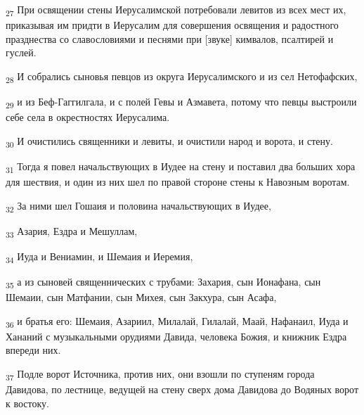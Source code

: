 \begin{tcolorbox}
\textsubscript{27} При освящении стены Иерусалимской потребовали левитов из всех мест их, приказывая им придти в Иерусалим для совершения освящения и радостного празднества со славословиями и песнями при [звуке] кимвалов, псалтирей и гуслей.
\end{tcolorbox}
\begin{tcolorbox}
\textsubscript{28} И собрались сыновья певцов из округа Иерусалимского и из сел Нетофафских,
\end{tcolorbox}
\begin{tcolorbox}
\textsubscript{29} и из Беф-Гаггилгала, и с полей Гевы и Азмавета, потому что певцы выстроили себе села в окрестностях Иерусалима.
\end{tcolorbox}
\begin{tcolorbox}
\textsubscript{30} И очистились священники и левиты, и очистили народ и ворота, и стену.
\end{tcolorbox}
\begin{tcolorbox}
\textsubscript{31} Тогда я повел начальствующих в Иудее на стену и поставил два больших хора для шествия, и один из них шел по правой стороне стены к Навозным воротам.
\end{tcolorbox}
\begin{tcolorbox}
\textsubscript{32} За ними шел Гошаия и половина начальствующих в Иудее,
\end{tcolorbox}
\begin{tcolorbox}
\textsubscript{33} Азария, Ездра и Мешуллам,
\end{tcolorbox}
\begin{tcolorbox}
\textsubscript{34} Иуда и Вениамин, и Шемаия и Иеремия,
\end{tcolorbox}
\begin{tcolorbox}
\textsubscript{35} а из сыновей священнических с трубами: Захария, сын Ионафана, сын Шемаии, сын Матфании, сын Михея, сын Закхура, сын Асафа,
\end{tcolorbox}
\begin{tcolorbox}
\textsubscript{36} и братья его: Шемаия, Азариил, Милалай, Гилалай, Маай, Нафанаил, Иуда и Хананий с музыкальными орудиями Давида, человека Божия, и книжник Ездра впереди них.
\end{tcolorbox}
\begin{tcolorbox}
\textsubscript{37} Подле ворот Источника, против них, они взошли по ступеням города Давидова, по лестнице, ведущей на стену сверх дома Давидова до Водяных ворот к востоку.
\end{tcolorbox}
